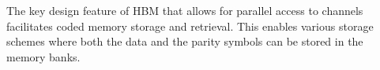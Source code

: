 The key design feature of HBM that allows for parallel access to channels facilitates coded memory storage and retrieval. This enables various storage schemes where both the data and the parity symbols can be stored in the memory banks.



